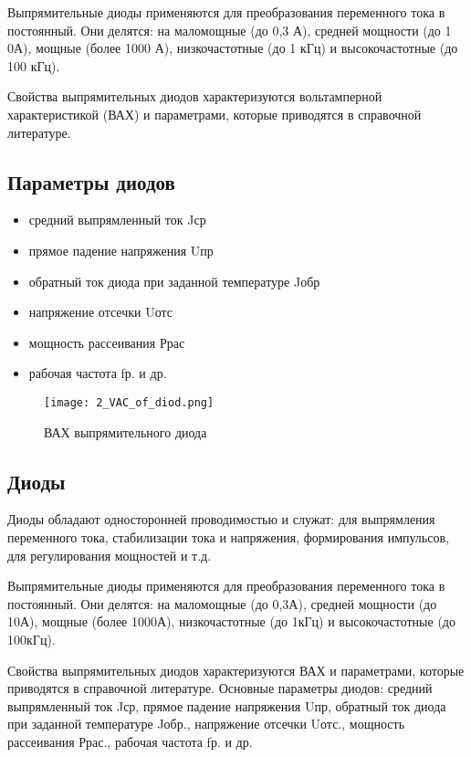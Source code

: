 Выпрямительные диоды применяются для преобразования переменного тока в постоянный. Они делятся: на маломощные (до 0,3 А), средней мощности (до 1 0А), мощные (более 1000 А), низкочастотные (до 1 кГц) и высокочастотные (до 100 кГц).

Свойства выпрямительных диодов характеризуются вольтамперной характеристикой (ВАХ) и параметрами, которые приводятся в справочной литературе.

\subsection*{Параметры диодов}

\begin{itemize}
\item средний выпрямленный ток Jср
\item прямое падение напряжения Uпр
\item обратный ток диода при заданной температуре Jобр
\item напряжение отсечки Uотс
\item мощность рассеивания Ррас
\item рабочая частота fр. и др.
\end{itemize}

\begin{figure}[H]
\centering
\texttt{[image: 2\_VAC\_of\_diod.png]}
\caption{ВАХ выпрямительного диода}
\label{fig:2_VAC_of_diod}
\end{figure}

\subsection*{Диоды}

Диоды обладают односторонней проводимостью и служат: для выпрямления переменного тока, стабилизации тока и напряжения, формирования импульсов, для регулирования мощностей и т.д.

Выпрямительные диоды применяются для преобразования переменного тока в постоянный. Они делятся: на маломощные (до 0,3А), средней мощности (до 10А), мощные (более 1000А), низкочастотные (до 1кГц) и высокочастотные (до 100кГц).

Свойства выпрямительных диодов характеризуются ВАХ и параметрами, которые приводятся в справочной литературе. Основные параметры диодов: средний выпрямленный ток Jср, прямое падение напряжения Uпр, обратный ток диода при заданной температуре Jобр., напряжение отсечки Uотс., мощность рассеивания Ррас., рабочая частота fр. и др.

